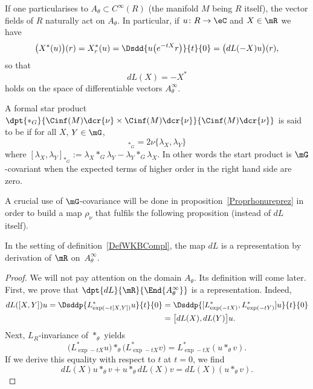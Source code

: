 If one particularises to  $ A_{\theta}\subset  C^{\infty}(R)$ (the manifold $M$ being $R$ itself), the vector fields of $R$ naturally act on $ A_{\theta}$. In particular, if $u\colon R\to \eC$ and $X\in \mR$ we have
\[
	\big( X^*(u) \big)(r)=X^*_r(u)=\Dsdd{ u\big(  e^{-tX}r \big) }{t}{0}=\big( dL(-X)u \big)(r),
\]
so that
\begin{equation}
	dL(X)=-X^*
\end{equation}
holds on the space of differentiable vectors $ A_{\theta}^{\infty}$.

\begin{definition}
	A formal star product $\dpt{\ast_G}{\Cinf(M)\dcr{\nu}\times \Cinf(M)\dcr{\nu}}{\Cinf(M)\dcr{\nu}}$ is said to be  if for all $X$, $Y\in\mG$,
	\begin{equation}
		[\lambda_X,\lambda_Y]_{\ast_G}=2\nu\{\lambda_X,\lambda_Y\}
	\end{equation}
	where $[\lambda_{X},\lambda_{Y}]_{\ast_{G}}:=\lambda_X\ast_G\lambda_Y-\lambda_Y\ast_G\lambda_X$. In other words the start product is $\mG$-covariant when the expected terms of higher order in the right hand side are zero.
\end{definition}

A crucial use of $\mG$-covariance will be done in proposition~\ref{Proprhonureprez} in order to build a map $\rho_{\nu}$ that fulfils the following proposition (instead of $dL$ itself).
\begin{proposition}
	In the setting of definition~\ref{DefWKBCompl}, the map $dL$ is a representation  by derivation of $\mR$  on~$ A_{\theta}^{\infty}$.
	\label{prop:dL_reprez}
\end{proposition}

\begin{proof}
	We will not pay attention on the domain $A_{\theta}$. Its definition will come later.  First, we prove that $\dpt{dL}{\mR}{\End{ A_{\theta}^{\infty}}}$ is a representation. Indeed,
	\begin{equation}
		\begin{split}
			dL([X,Y])u=\Dsddp{L^*_{\exp(-t[X,Y])}u}{t}{0}
			&=\Dsddp{ [ L^*_{\exp(-tX)},L^*_{\exp(-tY)}  ] u}{t}{0}\\
			&=\big[dL(X),dL(Y)\big]u.
		\end{split}
	\end{equation}
	Next, $L_R$-invariance of $\ast_{\theta}$ yields
	\[
		\big( L^*_{\exp -tX}u \big)\ast_{\theta}\big( L^*_{\exp -tX}v \big)=L^*_{\exp -tX}(u\ast_{\theta} v).
	\]
	If we derive this equality with respect to $t$ at $t=0$, we find
	\[
		dL(X)u\ast_{\theta} v+u\ast_{\theta} dL(X)v=dL(X)(u\ast_{\theta} v).
	\]
\end{proof}

